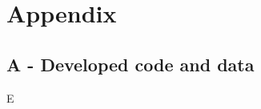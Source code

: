 \chapter{Appendix}
\label{cha:appendix}

\section{A - Developed code and data}
\label{sec:appendixA}

E